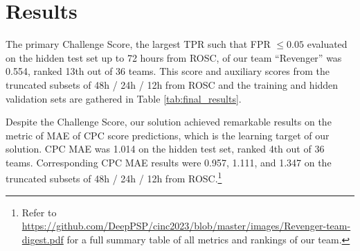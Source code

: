 \section{Results}
\label{sec:results}



% 


The primary Challenge Score, the largest TPR such that FPR $\le 0.05$ evaluated on the hidden test set up to 72 hours from ROSC, of our team ``Revenger'' was 0.554, ranked 13th out of 36 teams. This score and auxiliary scores from the truncated subsets of 48h / 24h / 12h from ROSC and the training and hidden validation sets are gathered in Table \ref{tab:final_results}.




 Despite the Challenge Score, our solution achieved remarkable results on the metric of MAE of CPC score predictions, which is the learning target of our solution. CPC MAE was 1.014 on the hidden test set, ranked 4th out of 36 teams. Corresponding CPC MAE results were 0.957, 1.111, and 1.347 on the truncated subsets of 48h / 24h / 12h from ROSC.\footnote{Refer to \url{https://github.com/DeepPSP/cinc2023/blob/master/images/Revenger-team-digest.pdf} for a full summary table of all metrics and rankings of our team.}
